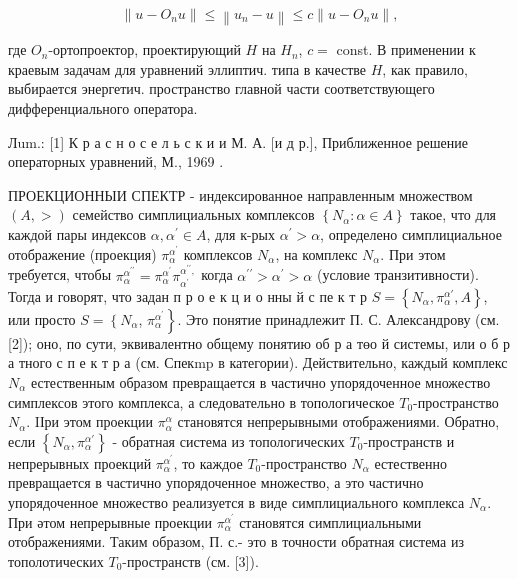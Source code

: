 \documentclass[10pt]{article}
\begin{document}
\[

\left\|u-O_{n} u\right\| \leqslant\left\|u_{n}-u\right\| \leqslant c\left\|u-O_{n} u\right\|,

\]



где $O_{n}$-ортопроектор, проектирующий $H$ на $H_{n}$, $c=$ const. В применении к краевым задачам для уравнений эллиптич. типа в качестве $H$, как правило, выбирается энергетич. пространство главной части соответствующего дифференциального оператора.



Лum.: [1] К р а с н о с е л ь с к и и М. А. [и д р.], Приближенное решение операторных уравнений, М., 1969 .



ПРОЕКЦИОННЫИ СПЕКТР - индексированное направленным множеством $(A,>)$ семейство симплициальных комплексов $\left\{N_{\alpha}: \alpha \in A\right\}$ такое, что для каждой пары индексов $\alpha, \alpha^{\prime} \in A$, для к-рых $\alpha^{\prime}>\alpha$, определено симплициальное отображение (проекция) $\pi_{\alpha}^{\alpha^{\prime}}$ комплексов $N_{\alpha}$, на комплекс $N_{\alpha}$. При этом требуется, чтобы $\pi_{\alpha}^{\alpha^{\prime \prime}}=\pi_{\alpha}^{\alpha^{\prime}} \pi_{\alpha^{\prime}}^{\alpha^{\prime \prime},}$ когда $\alpha^{\prime \prime}>\alpha^{\prime}>\alpha$ (условие транзитивности). Тогда и говорят, что задан п р о е к ц и о нны й с пе к т р $S=\left\{N_{\alpha}, \pi_{\alpha}^{\alpha \prime}, A\right\}$, или просто $S=\left\{N_{\alpha}\right.$, $\left.\pi_{\alpha}^{\alpha^{\prime}}\right\}$. Это понятие принадлежит П. С. Александрову (см. [2]); оно, по сути, эквивалентно общему понятию об р а төо й системы, или о б р а тного с п е к т р а (см. Спекmp в категории). Действительно, каждый комплекс $N_{\alpha}$ естественным образом превращается в частично упорядоченное множество симплексов этого комплекса, а следовательно в топологическое $T_{0}$-пространство $N_{\alpha}$. IІри этом проекции $\pi_{\alpha}^{\alpha}$ становятся непрерывными отображениями. Обратно, если $\left\{N_{\alpha}, \pi_{\alpha}^{\alpha \prime}\right\}$ - обратная система из топологических $T_{0}$-пространств и непрерывных проекций $\pi_{\alpha}^{\alpha^{\prime}}$, то каждое $T_{0}$-пространство $N_{\alpha}$ естественно превращается в частично упорядоченное множество, а это частично упорядоченное множество реализуется в виде симплициального комплекса $N_{\alpha}$. При әтом непрерывные проекции $\pi_{\alpha}^{\alpha^{\prime}}$ становятся симплициальными отображениями. Таким образом, П. с.- это в точности обратная система из тополотических $T_{0}$-пространств (см. [3]).
\end{document}
